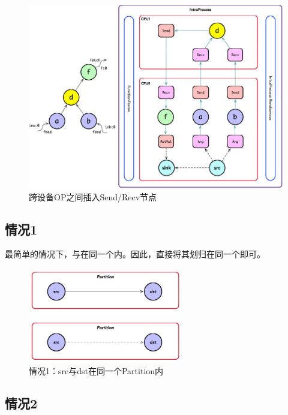 \begin{content}
\begin{figure}[H]
\centering
\includegraphics[width=1.0\textwidth]{figures/local-graph-split-insert-send-recv.png}
\caption{跨设备OP之间插入Send/Recv节点}
 \label{fig:local-graph-split-insert-send-recv}
\end{figure}

\subsection{情况1}

最简单的情况下，与在同一个内。因此，直接将其划归在同一个即可。

\begin{figure}[H]
\centering
\includegraphics[width=0.6\textwidth]{figures/split-graph-1.png}
\caption{情况1：src与dst在同一个Partition内}
 \label{fig:split-graph-1}
\end{figure}

\subsection{情况2}


\end{content}
